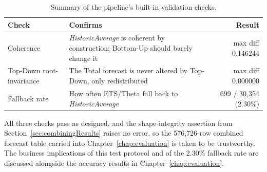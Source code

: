 \begin{table}[htbp]
	\centering
	\small
	\caption{Summary of the pipeline's built-in validation checks.}
	\label{table:validationChecks}
	\begin{tabularx}{\linewidth}{@{} l X r @{}}
		\toprule
		\textbf{Check} & \textbf{Confirms} & \textbf{Result} \\
		\midrule
		Coherence & \textit{HistoricAverage} is coherent by construction; Bottom-Up should barely change it & max diff 0.146244 \\
		\addlinespace
		Top-Down root-invariance & The Total forecast is never altered by Top-Down, only redistributed & max diff 0.000000 \\
		\addlinespace
		Fallback rate & How often ETS/Theta fall back to \textit{HistoricAverage} & 699 / 30,354 (2.30\%) \\
		\bottomrule
	\end{tabularx}
\end{table}

All three checks pass as designed, and the shape-integrity assertion from Section~\ref{sec:combiningResults} raises no error, so the 576,726-row combined forecast table carried into Chapter~\ref{chap:evaluation} is taken to be trustworthy. The business implications of this test protocol and of the 2.30\% fallback rate are discussed alongside the accuracy results in Chapter~\ref{chap:evaluation}.
